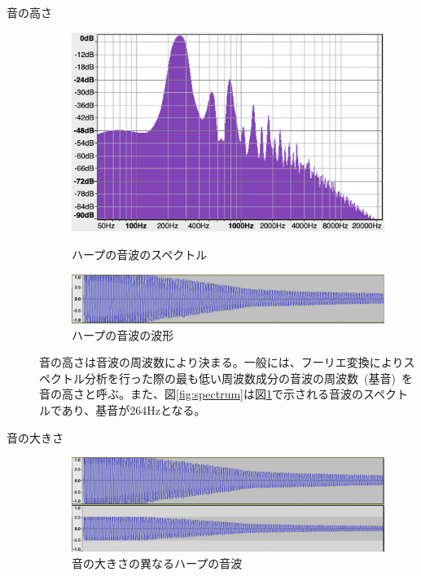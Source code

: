 \begin{description}

\item[音の高さ]\mbox{}

\begin{figure}[t]
\begin{center}
\begin{minipage}{0.48\hsize}
\begin{center}
\includegraphics[width=0.95\hsize]{figure/c4_harp_spectrum.png}
\caption{ハープの音波のスペクトル}
\label{fig:spectrum}
\end{center}
\end{minipage}
\begin{minipage}{0.48\hsize}
\begin{center}
\includegraphics[width=0.95\hsize]{figure/c4_harp_wav.png}
\caption{ハープの音波の波形}
\label{fig:wav}
\end{center}
\end{minipage}
\end{center}
\end{figure}

音の高さは音波の周波数により決まる。一般には、フーリエ変換によりスペクトル分析を行った際の最も低い周波数成分の音波の周波数~(基音)~を音の高さと呼ぶ。また、図\ref{fig:spectrum}は図\ref{fig:wav}で示される音波のスペクトルであり、基音が264Hzとなる。

\item[音の大きさ]\mbox{}

\begin{figure}[t]
\begin{center}
\includegraphics[width=0.7\hsize]{figure/c4_harp_loudness.png}
\caption{音の大きさの異なるハープの音波}
\label{fig:loudness}
\end{center}
\end{figure}


\end{description}
